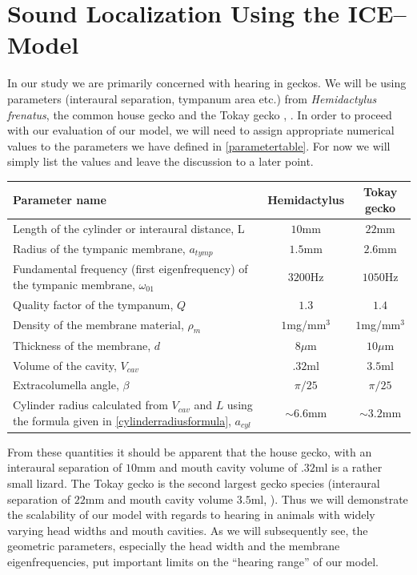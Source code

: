 \section{Sound Localization Using the ICE--Model}\label{localizationsection}
In our study we are primarily concerned with hearing in geckos. We will be using
parameters (interaural separation, tympanum area etc.) from \emph{Hemidactylus frenatus}, the common house gecko
\cite{dalsgaardmanley2} and the Tokay gecko \cite{dalsgaardmanley1}, \cite{dalsgaardtangcarr}. In order to proceed
with our evaluation of our model, we will need to assign appropriate numerical values to the parameters we have
defined in \ref{parametertable}. For now we will simply list the values and leave the discussion to a later point.

\vspace{\baselineskip}
\noindent
\begin{minipage}{\linewidth}
\renewcommand{\arraystretch}{1.3}
\centering
{}\label{geckogeometricparams}
\begin{tabular}{|p{8.5 cm} | c | c|}
\hline
Parameter name & Hemidactylus & Tokay gecko\\
\hline
Length of the cylinder or interaural distance, L & $10$mm & $22$mm\\
Radius of the tympanic membrane, $a_{tymp}$& $1.5$mm & $2.6$mm\\
Fundamental frequency (first eigenfrequency) of the tympanic membrane, $\omega_{01}$ & $3200$Hz & $1050$Hz\\
Quality factor of the tympanum, $Q$ & $1.3$ &  $1.4$\\
Density of the membrane material, $\rho_m$ & $1$mg/mm$^3$ & $1$mg/mm$^3$\\
Thickness of the membrane, $d$& $8\mu$m & $10\mu$m\\
Volume of the cavity, $V_{cav}$ & $.32$ml & $3.5$ml\\ 
Extracolumella angle, $\beta$ & $\pi/25$ & $\pi/25$\\
Cylinder radius calculated from $V_{cav}$ and $L$ using the formula given in \eqref{cylinderradiusformula}, $a_{cyl}$ & $\sim 6.6$mm  &$\sim 3.2$mm \\
\hline
\end {tabular}\par
\bigskip
\end{minipage}
From these quantities it should be apparent that the house gecko, with an interaural separation of $10$mm and mouth cavity volume of $.32$ml is a rather
small lizard. The Tokay gecko is the second largest gecko species (interaural separation of $22$mm and mouth cavity volume $3.5$ml, \cite{dalsgaardmanley2}).
Thus we will demonstrate the scalability of our model with regards to hearing in animals with widely varying head widths and mouth cavities. As we will subsequently see, the geometric parameters, especially
the head width and the membrane eigenfrequencies, put important limits on the ``hearing range'' of our model.

